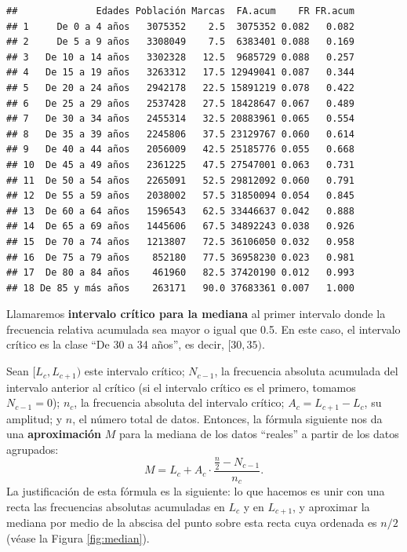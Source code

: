\documentclass[]{book}
\theoremstyle{definition}
\theoremstyle{definition}
\theoremstyle{definition}
\theoremstyle{remark}
\begin{document}
\begin{verbatim}
##              Edades Población Marcas  FA.acum    FR FR.acum
## 1     De 0 a 4 años   3075352    2.5  3075352 0.082   0.082
## 2     De 5 a 9 años   3308049    7.5  6383401 0.088   0.169
## 3   De 10 a 14 años   3302328   12.5  9685729 0.088   0.257
## 4   De 15 a 19 años   3263312   17.5 12949041 0.087   0.344
## 5   De 20 a 24 años   2942178   22.5 15891219 0.078   0.422
## 6   De 25 a 29 años   2537428   27.5 18428647 0.067   0.489
## 7   De 30 a 34 años   2455314   32.5 20883961 0.065   0.554
## 8   De 35 a 39 años   2245806   37.5 23129767 0.060   0.614
## 9   De 40 a 44 años   2056009   42.5 25185776 0.055   0.668
## 10  De 45 a 49 años   2361225   47.5 27547001 0.063   0.731
## 11  De 50 a 54 años   2265091   52.5 29812092 0.060   0.791
## 12  De 55 a 59 años   2038002   57.5 31850094 0.054   0.845
## 13  De 60 a 64 años   1596543   62.5 33446637 0.042   0.888
## 14  De 65 a 69 años   1445606   67.5 34892243 0.038   0.926
## 15  De 70 a 74 años   1213807   72.5 36106050 0.032   0.958
## 16  De 75 a 79 años    852180   77.5 36958230 0.023   0.981
## 17  De 80 a 84 años    461960   82.5 37420190 0.012   0.993
## 18 De 85 y más años    263171   90.0 37683361 0.007   1.000
\end{verbatim}

Llamaremos \textbf{intervalo crítico para la mediana} al primer intervalo donde la frecuencia relativa acumulada sea mayor o igual que 0.5.
En este caso, el intervalo crítico es la clase ``De 30 a 34 años'', es decir, \([30,35)\).

Sean \([L_c, L_{c+1})\) este intervalo crítico; \(N_{c-1}\), la frecuencia absoluta acumulada del intervalo anterior al crítico (si el intervalo crítico es el primero, tomamos \(N_{c-1}=0\)); \(n_c\), la frecuencia absoluta del intervalo crítico; \(A_c=L_{c+1}-L_c\), su amplitud; y \(n\), el número total de datos. Entonces, la fórmula siguiente nos da una \textbf{aproximación} \(M\) para la mediana de los datos ``reales'' a partir de los datos agrupados:
\[
M=L_{c}+A_c\cdot \frac{\frac{n}{2}- N_{c-1}}{n_c}.
\]
La justificación de esta fórmula es la siguiente: lo que hacemos es unir con una recta las frecuencias absolutas acumuladas en \(L_c\) y en \(L_{c+1}\), y aproximar la mediana por medio de la abscisa del punto sobre esta recta cuya ordenada es \(n/2\) (véase la Figura \ref{fig:median}).
\end{document}
